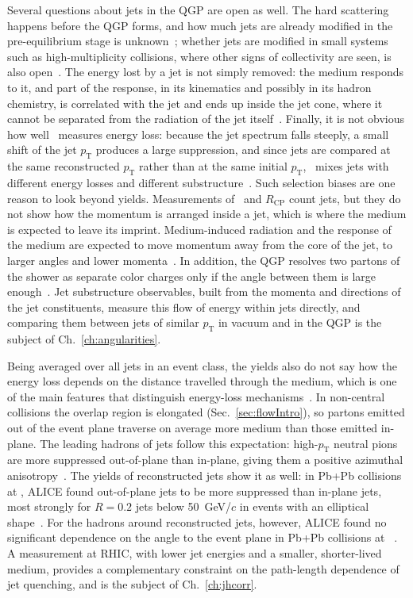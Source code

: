 Several questions about jets in the QGP are open as well.
%
The hard scattering happens before the QGP forms, and how much jets are already modified in the pre-equilibrium stage is unknown~\cite{Andres:2019eus}; whether jets are modified in small systems such as high-multiplicity \pp collisions, where other signs of collectivity are seen, is also open~\cite{Nagle:2018nvi}.
%
The energy lost by a jet is not simply removed: the medium responds to it, and part of the response, in its kinematics and possibly in its hadron chemistry, is correlated with the jet and ends up inside the jet cone, where it cannot be separated from the radiation of the jet itself~\cite{Cao:2020wlm}.
%
Finally, it is not obvious how well \RAA~measures energy loss: because the jet spectrum falls steeply, a small shift of the jet \(p_\mathrm{T}\) produces a large suppression, and since jets are compared at the same reconstructed \(p_\mathrm{T}\) rather than at the same initial \(p_\mathrm{T}\), \RAA~mixes jets with different energy losses and different substructure~\cite{Brewer:2018dfs}.
%
Such selection biases are one reason to look beyond yields.
%
Measurements of \RAA~and \(R_\mathrm{CP}\) count jets, but they do not show how the momentum is arranged inside a jet, which is where the medium is expected to leave its imprint.
%
Medium-induced radiation and the response of the medium are expected to move momentum away from the core of the jet, to larger angles and lower momenta~\cite{Cao:2020wlm}.
%
In addition, the QGP resolves two partons of the shower as separate color charges only if the angle between them is large enough~\cite{Casalderrey-Solana:2012evi}.
%
Jet substructure observables, built from the momenta and directions of the jet constituents, measure this flow of energy within jets directly, and comparing them between jets of similar \(p_\mathrm{T}\) in vacuum and in the QGP is the subject of Ch.~\ref{ch:angularities}.


Being averaged over all jets in an event class, the yields also do not say how the energy loss depends on the distance travelled through the medium, which is one of the main features that distinguish energy-loss mechanisms~\cite{Liou:2013qya}.
%
In non-central collisions the overlap region is elongated (Sec.~\ref{sec:flowIntro}), so partons emitted out of the event plane traverse on average more medium than those emitted in-plane.
%
The leading hadrons of jets follow this expectation: high-\(p_\mathrm{T}\) neutral pions are more suppressed out-of-plane than in-plane, giving them a positive azimuthal anisotropy~\cite{PhysRevC.76.034904}.
%
The yields of reconstructed jets show it as well: in Pb+Pb collisions at , ALICE found out-of-plane jets to be more suppressed than in-plane jets, most strongly for \(R = 0.2\) jets below 50~GeV/\(c\) in events with an elliptical shape~\cite{ALICE:2023dei}.
%
For the hadrons around reconstructed jets, however, ALICE found no significant dependence on the angle to the event plane in Pb+Pb collisions at ~\cite{PhysRevC.101.064901}.
%
A measurement at RHIC, with lower jet energies and a smaller, shorter-lived medium, provides a complementary constraint on the path-length dependence of jet quenching, and is the subject of Ch.~\ref{ch:jhcorr}.

